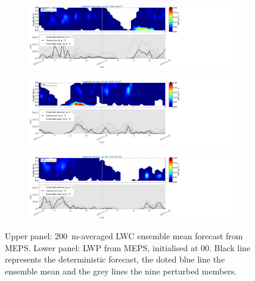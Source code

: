 \begin{figure}\ContinuedFloat        
	\centering
	\begin{subfigure}[t]{0.85\textwidth}
		\includegraphics[trim={0.5cm 0.5cm 27cm .5cm},clip,width=\textwidth]{./fig_LWC/20161224}
		\caption{}\label{fig:LWC24}
	\end{subfigure}
	
	\centering
	\begin{subfigure}[t]{0.85\textwidth}
		\includegraphics[trim={0.5cm 0.5cm 27cm .5cm},clip,width=\textwidth]{./fig_LWC/20161225}
		\caption{}\label{fig:LWC25}
	\end{subfigure}
	\centering
	\begin{subfigure}[t]{0.85\textwidth}
		\includegraphics[trim={0.5cm 0.5cm 27cm .5cm},clip,width=\textwidth]{./fig_LWC/20161226}
		\caption{}\label{fig:LWC26}
	\end{subfigure}
	\caption{Upper panel: \SI{200}{\metre}-averaged LWC ensemble mean forecast from MEPS. 
		Lower panel: LWP from MEPS, initialised at \SI{00}{\UTC}. Black line represents the deterministic forecast, the doted blue line the ensemble mean and the grey lines the nine perturbed members.}\label{fig:LWC}
\end{figure}
